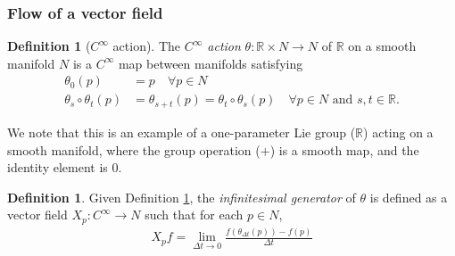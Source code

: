 \documentclass[psamsfonts]{amsart}
\theoremstyle{definition}
\newtheorem{defn}[thm]{Definition}
\theoremstyle{remark}
\newcommand*\R{\mathds{R}}
\numberwithin{equation}{section}
\begin{document}
\subsubsection{Flow of a vector field}

\begin{defn}[$C^{\infty}$ action]\label{defn:cinfaction}
The \textit{$C^{\infty}$ action} $\theta:\R \times N \rightarrow N$ of $\R$ on a smooth manifold $N$ is a $C^{\infty}$ map between manifolds satisfying
\begin{equation}
\begin{aligned}
\theta_0(p) &= p \quad \forall p\in N\\
\theta_s \circ \theta_t (p) &= \theta_{s+t}(p) = \theta_t\circ \theta_s (p) \quad \forall p\in N \text{ and } s, t \in \R. 
\end{aligned}%
\end{equation}
\end{defn}

We note that this is an example of a one-parameter Lie group ($\R$) acting on a smooth manifold, where the group operation ($+$) is a smooth map, and the identity element is $0$. 

\begin{defn}
Given Definition \ref{defn:cinfaction}, the \textit{infinitesimal generator} of $\theta$ is defined as a vector field $X_p:C^{\infty}\rightarrow N$ such that for each $p\in N$, 
\begin{align}
X_pf = \lim_{\Delta t \rightarrow 0}\frac{f\left(\theta_{\Delta t}(p)\right)-f(p)}{\Delta t}
\end{align}
\end{defn}
\end{document}
